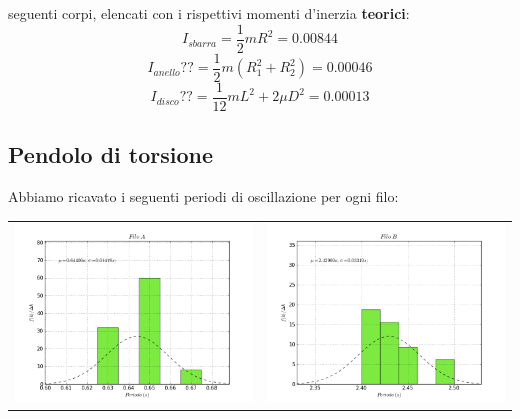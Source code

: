 seguenti corpi, elencati con i rispettivi momenti d'inerzia \textbf{teorici}:
$$ I_{sbarra} = \frac{1}{2} m R^2 = 0.00844 $$
$$ I_{anello}?? =\frac{1}{2} m (R^2_1 + R^2_2) = 0.00046 $$
$$ I_{disco}?? = \frac{1}{12} m L^2 + 2 \mu D^2 = 0.00013 $$



\subsection{Pendolo di torsione}

Abbiamo ricavato i seguenti periodi di oscillazione per ogni filo:
\\
\begin{tabular}{cc}
\includegraphics[scale=0.4]{../grafici/FiloA.png}
&
\includegraphics[scale=0.4]{../grafici/FiloB.png}

\end{tabular}
